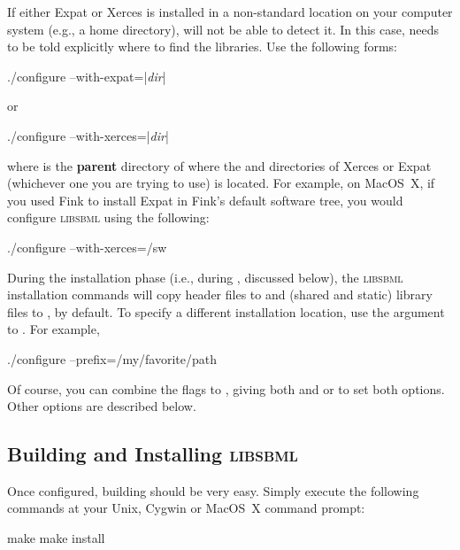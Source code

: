 \documentclass{sbmlmanual}
\newcommand{\libsbml}{\textsc{libsbml}}
\begin{document}
If either Expat or Xerces is installed in a non-standard location on your
computer system (e.g., a home directory),  will not be
able to detect it.  In this case,  needs to be told
explicitly where to find the libraries.  Use the following forms:

\begin{example}[csh]
  ./configure --with-expat=|\emph{dir}|
\end{example}
or
\begin{example}[csh]
  ./configure --with-xerces=|\emph{dir}|
\end{example}

where  is the \textbf{parent} directory of where the
 and  directories of Xerces or Expat (whichever
one you are trying to use) is located.  For example, on MacOS~X, if you
used Fink to install Expat in Fink's default software tree, you would
configure \libsbml{} using the following:

\begin{example}[csh]
  ./configure --with-xerces=/sw
\end{example}

During the installation phase (i.e., during ,
discussed below), the \libsbml{} installation commands will copy header
files to  and (shared and static) library
files to , by default.  To specify a different
installation location, use the  argument to
.  For example,

\begin{example}[csh]
  ./configure --prefix=/my/favorite/path
\end{example}

Of course, you can combine the flags to , giving both
 and  or  to set
both options.  Other options are described below.


\subsection{Building and Installing \libsbml{}}

Once configured, building should be very easy.  Simply execute the
following commands at your Unix, Cygwin or MacOS~X command prompt:

\begin{example}[csh]
  make
  make install
\end{example}
\end{document}

